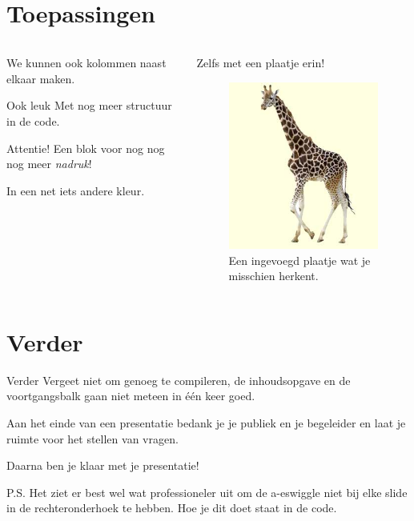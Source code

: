 \documentclass{beamer}
\theoremstyle{definition}
\theoremstyle{example}
\begin{document}
\section{Toepassingen}
\begin{frame}
\begin{columns}[T]
	\begin{column}[T]{5cm}
		We kunnen ook kolommen naast elkaar maken.
		
		\begin{block}{Ook leuk}
			Met nog meer structuur in de code.
		\end{block}
		\begin{alertblock}{Attentie!}
			Een blok voor nog nog nog meer \emph{nadruk}!
			
			In een net iets andere kleur.
		\end{alertblock}
	\end{column}
	\begin{column}[T]{5cm}
		Zelfs met een plaatje erin!
		\begin{figure}
			\includegraphics[scale=0.4]{Giraffe_klein.jpg}
			\caption{Een ingevoegd plaatje wat je misschien herkent.}
		\end{figure}
		
	\end{column}
\end{columns}
\end{frame}


\section{Verder}


\begin{frame}{Verder}
Vergeet niet om genoeg te compileren, de inhoudsopgave en de voortgangsbalk gaan niet meteen in \'e\'en keer goed.

Aan het einde van een presentatie bedank je je publiek en je begeleider en laat je ruimte voor het stellen van vragen.

Daarna ben je klaar met je presentatie!
\end{frame}

\begin{frame}{P.S.}
	Het ziet er best wel wat professioneler uit om de a-eswiggle niet bij elke slide in de rechteronderhoek te hebben.
	Hoe je dit doet staat in de code. %
\end{frame}
\end{document}
